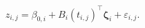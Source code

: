 \begin{equation}
  z_{i, j} = \beta_{0, i} + B_{i}(t_{i, j})^{\top}\boldsymbol{\zeta}_{i} + \varepsilon_{i, j}.
  \label{eqn:pf-model-def}
\end{equation}
